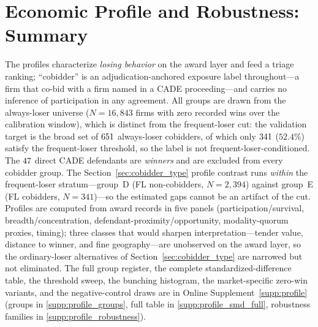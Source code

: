 \section{Economic Profile and Robustness: Summary}
\label{app:profile_submission}

The profiles characterize \emph{losing behavior} on the award layer and
feed a triage ranking; ``cobidder'' is an adjudication-anchored exposure
label throughout---a firm that co-bid with a firm named in a CADE
proceeding---and carries no inference of participation in any agreement.
All groups are drawn from the always-loser universe ($N=16{,}843$ firms
with zero recorded wins over the calibration window), which is distinct
from the frequent-loser cut: the validation target is the broad set of
$651$ always-loser cobidders, of which only $341$
($52.4\%$) satisfy the frequent-loser threshold, so the label is not
frequent-loser-conditioned. The $47$ direct CADE defendants
are \emph{winners} and are excluded from every cobidder group. The
Section~\ref{sec:cobidder_type} profile contrast runs \emph{within} the
frequent-loser stratum---group~D (FL non-cobidders, $N=2{,}394$) against
group~E (FL cobidders, $N=341$)---so the estimated gaps cannot be an
artifact of the cut. Profiles are computed from award records in five
panels (participation/survival, breadth/concentration,
defendant-proximity/opportunity, modality-quorum proxies, timing); three
classes that would sharpen interpretation---tender value, distance to
winner, and fine geography---are unobserved on the award layer, so the
ordinary-loser alternatives of Section~\ref{sec:cobidder_type} are
narrowed but not eliminated. The full group register, the complete
standardized-difference table, the threshold sweep, the bunching
histogram, the market-specific zero-win variants, and the negative-control
draws are in Online Supplement~\ref{supp:profile} (groups in
\ref{supp:profile_groups}, full table in \ref{supp:profile_smd_full},
robustness families in \ref{supp:profile_robustness}).

